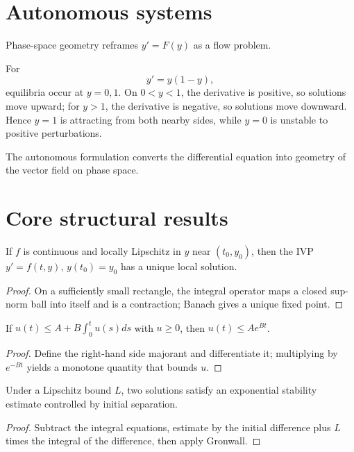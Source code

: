 \section{Autonomous systems}
Phase-space geometry reframes $y'=F(y)$ as a flow problem.


\begin{example}\label{ex:ii19-expand-03}
For
\[
y'=y(1-y),
\]
equilibria occur at \(y=0,1\). On \(0<y<1\), the derivative is positive, so
solutions move upward; for \(y>1\), the derivative is negative, so solutions
move downward. Hence \(y=1\) is attracting from both nearby sides, while
\(y=0\) is unstable to positive perturbations.

The autonomous formulation converts the differential equation into geometry of
the vector field on phase space.
\end{example}
\section{Core structural results}

\begin{theorem}\label{thm:ii19-01}
If $f$ is continuous and locally Lipschitz in $y$ near $(t_0,y_0)$, then the IVP $y'=f(t,y)$, $y(t_0)=y_0$ has a unique local solution.
\begin{proof}
On a sufficiently small rectangle, the integral operator maps a closed sup-norm ball into itself and is a contraction; Banach gives a unique fixed point.
\end{proof}
\end{theorem}

\begin{theorem}\label{thm:ii19-02}
If $u(t)\le A+B\int_0^tu(s)ds$ with $u\ge0$, then $u(t)\le Ae^{Bt}$.
\begin{proof}
Define the right-hand side majorant and differentiate it; multiplying by $e^{-Bt}$ yields a monotone quantity that bounds $u$.
\end{proof}
\end{theorem}

\begin{theorem}\label{thm:ii19-03}
Under a Lipschitz bound $L$, two solutions satisfy an exponential stability estimate controlled by initial separation.
\begin{proof}
Subtract the integral equations, estimate by the initial difference plus $L$ times the integral of the difference, then apply Gronwall.
\end{proof}
\end{theorem}

